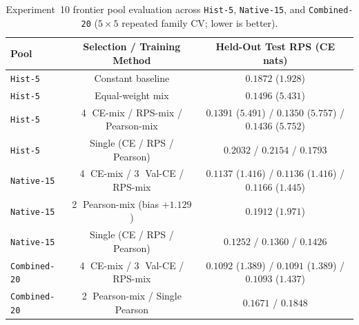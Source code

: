 \begin{table}[t]
\centering
\caption{Experiment~10 frontier pool evaluation across \texttt{Hist-5}, \texttt{Native-15}, and \texttt{Combined-20} ($5\times 5$ repeated family CV; lower is better).}
\label{tab:supp-frontier-pools}
\small
\begin{tabular}{@{}lcc@{}}
\hline
Pool & Selection / Training Method & Held-Out Test RPS (CE nats) \\
\hline
\texttt{Hist-5} & Constant baseline & $0.1872$ ($1.928$) \\
\texttt{Hist-5} & Equal-weight mix & $0.1496$ ($5.431$) \\
\texttt{Hist-5} & \textcircled{4} CE-mix / RPS-mix / Pearson-mix & $0.1391$ ($5.491$) / $0.1350$ ($5.757$) / $0.1436$ ($5.752$) \\
\texttt{Hist-5} & Single (CE / RPS / Pearson) & $0.2032$ / $0.2154$ / $0.1793$ \\
\hline
\texttt{Native-15} & \textcircled{4} CE-mix / \textcircled{3} Val-CE / RPS-mix & $0.1137$ ($1.416$) / $0.1136$ ($1.416$) / $0.1166$ ($1.445$) \\
\texttt{Native-15} & \textcircled{2} Pearson-mix (bias $+1.129$) & $0.1912$ ($1.971$) \\
\texttt{Native-15} & Single (CE / RPS / Pearson) & $0.1252$ / $0.1360$ / $0.1426$ \\
\hline
\texttt{Combined-20} & \textcircled{4} CE-mix / \textcircled{3} Val-CE / RPS-mix & $0.1092$ ($1.389$) / $0.1091$ ($1.389$) / $0.1093$ ($1.437$) \\
\texttt{Combined-20} & \textcircled{2} Pearson-mix / Single Pearson & $0.1671$ / $0.1848$ \\
\hline
\end{tabular}
\end{table}

